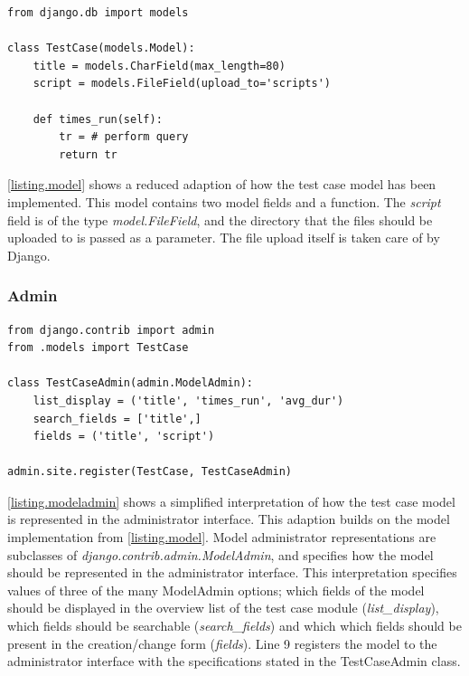 \vspace{4mm}
\begin{lstlisting}[caption=Model Implementation, label={listing.model}]
from django.db import models
 
class TestCase(models.Model):
    title = models.CharField(max_length=80)
    script = models.FileField(upload_to='scripts')
    
    def times_run(self):
        tr = # perform query
        return tr
\end{lstlisting}

\lstlistingname \space \ref{listing.model} shows a reduced adaption of how the test case model has been implemented. This model contains two model fields and a function. The \emph{script} field is of the type \emph{model.FileField}, and the directory that the files should be uploaded to is passed as a parameter. The file upload itself is taken care of by Django.





\subsubsection{Admin}


\vspace{4mm}
\begin{lstlisting}[caption=Implementation of Model in Administrator Interface, label={listing.modeladmin}, float=bp, floatplacement=btp]
from django.contrib import admin
from .models import TestCase

class TestCaseAdmin(admin.ModelAdmin):
    list_display = ('title', 'times_run', 'avg_dur')
    search_fields = ['title',]
    fields = ('title', 'script')
 
admin.site.register(TestCase, TestCaseAdmin)
\end{lstlisting}

\lstlistingname \space \ref{listing.modeladmin} shows a simplified interpretation of how the test case model is represented in the administrator interface. This adaption builds on the model implementation from \lstlistingname \space \ref{listing.model}. Model administrator representations are subclasses of \emph{django.contrib.admin.ModelAdmin}, and specifies how the model should be represented in the administrator interface. This interpretation specifies values of three of the many ModelAdmin options; which fields of the model should be displayed in the overview list of the test case module (\emph{list\_display}), which fields should be searchable (\emph{search\_fields}) and which which fields should be present in the creation/change form (\emph{fields}). Line 9 registers the model to the administrator interface with the specifications stated in the TestCaseAdmin class.

